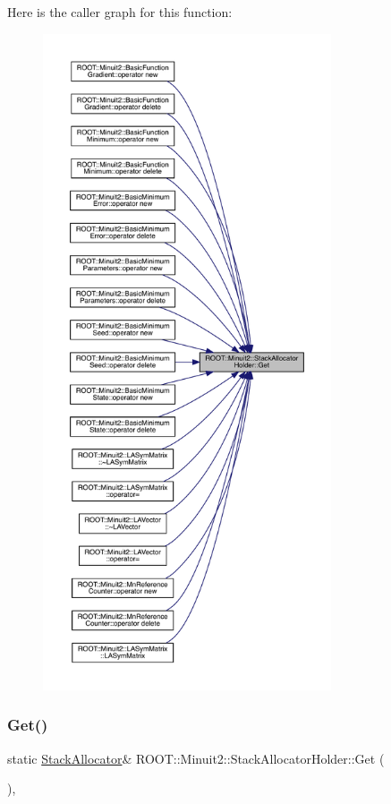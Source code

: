 Here is the caller graph for this function\+:\nopagebreak
\begin{figure}[H]
\begin{center}
\leavevmode
\includegraphics[height=550pt]{d7/d96/classROOT_1_1Minuit2_1_1StackAllocatorHolder_ae380b3ed5065e114b12ac61207542466_icgraph}
\end{center}
\end{figure}
\mbox{\label{classROOT_1_1Minuit2_1_1StackAllocatorHolder_ae380b3ed5065e114b12ac61207542466}} 
\subsubsection{\texorpdfstring{Get()}{Get()}\hspace{0.1cm}{\footnotesize\ttfamily [2/3]}}
{\footnotesize\ttfamily static \mbox{\hyperlink{classROOT_1_1Minuit2_1_1StackAllocator}{Stack\+Allocator}}\& R\+O\+O\+T\+::\+Minuit2\+::\+Stack\+Allocator\+Holder\+::\+Get (\begin{DoxyParamCaption}{ }\end{DoxyParamCaption})\hspace{0.3cm}{\ttfamily [inline]}, {\ttfamily [static]}}

